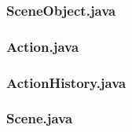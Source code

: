 \subsubsection{SceneObject.java}

\subsubsection{Action.java}

\subsubsection{ActionHistory.java}

\subsubsection{Scene.java}

